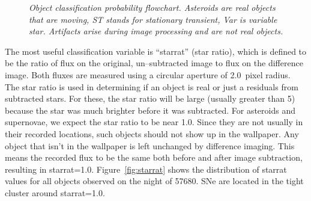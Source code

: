 \documentclass[aps,prb,twocolumn,superscriptaddress]{revtex4-1}
\begin{document}
\begin{figure}[h!]%
 \caption{\it \small{Object classification probability flowchart.  Asteroids are real objects that are moving, ST stands for stationary transient, Var is variable star. Artifacts arise during image processing and are not real objects.\label{fig:probflow}}}
\end{figure}

The most useful classification variable is ``starrat'' (star ratio), 
which is defined to be the ratio of flux on the original, un--subtracted 
image to flux on the difference image.  Both fluxes are measured using a 
circular aperture of 2.0~pixel radius.  The star ratio is used in 
determining if an object is real or just a residuals from subtracted stars.  
For these, the star ratio will be large (usually greater than 5) because 
the star was much brighter before it was subtracted.  For asteroids and 
supernovae, we expect the star ratio to be near 1.0.  Since they are not 
usually in their recorded locations, such objects should not show up in the wallpaper.  
Any object that isn't in the wallpaper is left unchanged by difference imaging.  
This means the recorded flux to be the same both before and after image subtraction, 
resulting in starrat=1.0.  Figure~\ref{fig:starrat} shows the distribution of starrat 
values for all objects observed on the night of 57680.  SNe are located in the 
tight cluster around starrat=1.0.
\end{document}
